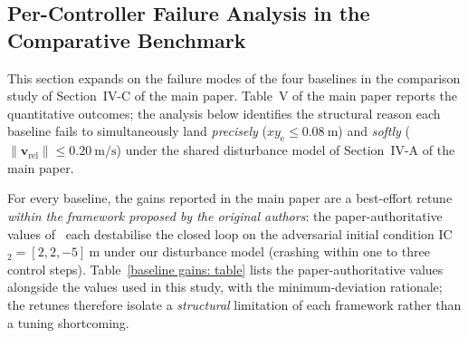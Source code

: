 \documentclass[10pt,journal]{IEEEtran}
\begin{document}
\subsection{Per-Controller Failure Analysis in the Comparative Benchmark}
\label{sec:sup-comparison}

This section expands on the failure modes of the four baselines in the comparison study of Section~IV-C of the main paper. Table~V of the main paper reports the quantitative outcomes; the analysis below identifies the structural reason each baseline fails to simultaneously land \emph{precisely} ($xy_\text{e}\le 0.08~\text{m}$) and \emph{softly} ($\|\boldsymbol{v}_\text{rel}\|\le 0.20~\text{m/s}$) under the shared disturbance model of Section~IV-A of the main paper.

For every baseline, the gains reported in the main paper are a best-effort retune \emph{within the framework proposed by the original authors}: the paper-authoritative values of~\cite{lin2022,zhang2026,chen2025,cho2022} each destabilise the closed loop on the adversarial initial condition IC$_2=[2,2,-5]~\text{m}$ under our disturbance model (crashing within one to three control steps). Table~\ref{baseline gains: table} lists the paper-authoritative values alongside the values used in this study, with the minimum-deviation rationale; the retunes therefore isolate a \emph{structural} limitation of each framework rather than a tuning shortcoming.
\end{document}
